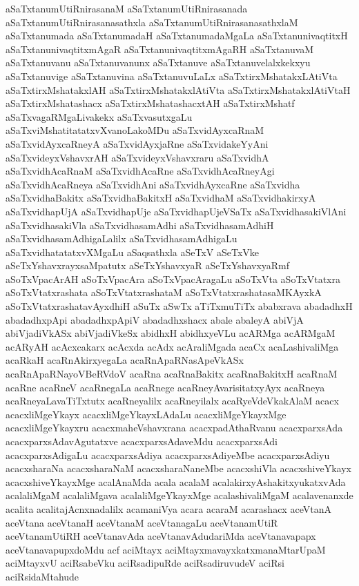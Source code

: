 {aSaTxtanumUtiRnirasanaM
aSaTxtanumUtiRnirasanada
aSaTxtanumUtiRnirasanasathxla
aSaTxtanumUtiRnirasanasathxlaM
aSaTxtanumada
aSaTxtanumadaH
aSaTxtanumadaMgaLa
aSaTxtanunivaqtitxH
aSaTxtanunivaqtitxmAgaR
aSaTxtanunivaqtitxmAgaRH
aSaTxtanuvaM
aSaTxtanuvanu
aSaTxtanuvanunx
aSaTxtanuve
aSaTxtanuvelalxkekxyu
aSaTxtanuvige
aSaTxtanuvina
aSaTxtanuvuLaLx
aSaTxtirxMshatakxLAtiVta
aSaTxtirxMshatakxlAH
aSaTxtirxMshatakxlAtiVta
aSaTxtirxMshatakxlAtiVtaH
aSaTxtirxMshatashacx
aSaTxtirxMshatashacxtAH
aSaTxtirxMshatf
aSaTxvagaRMgaLivakekx
aSaTxvasutxgaLu
aSaTxviMshatitatatxvXvanoLakoMDu
aSaTxvidAyxcaRnaM
aSaTxvidAyxcaRneyA
aSaTxvidAyxjaRne
aSaTxvidakeYyAni
aSaTxvideyxVshavxrAH
aSaTxvideyxVshavxraru
aSaTxvidhA
aSaTxvidhAcaRnaM
aSaTxvidhAcaRne
aSaTxvidhAcaRneyAgi
aSaTxvidhAcaRneya
aSaTxvidhAni
aSaTxvidhAyxcaRne
aSaTxvidha
aSaTxvidhaBakitx
aSaTxvidhaBakitxH
aSaTxvidhaM
aSaTxvidhakirxyA
aSaTxvidhapUjA
aSaTxvidhapUje
aSaTxvidhapUjeVSaTx
aSaTxvidhasakiVlAni
aSaTxvidhasakiVla
aSaTxvidhasamAdhi
aSaTxvidhasamAdhiH
aSaTxvidhasamAdhigaLalilx
aSaTxvidhasamAdhigaLu
aSaTxvidhatatatxvXMgaLu
aSaqsathxla
aSeTxV
aSeTxVke
aSeTxYshavxrayxsaMpatutx
aSeTxYshavxyaR
aSeTxYshavxyaRmf
aSoTxVpacArAH
aSoTxVpacAra
aSoTxVpacAragaLu
aSoTxVta
aSoTxVtatxra
aSoTxVtatxrashata
aSoTxVtatxrashataM
aSoTxVtatxrashatasaMKAyxkA
aSoTxVtatxrashatavAyxdhiH
aSuTx
aSwTx
aTiTxmuTiTx
ababxrava
abadadhxH
abadadhxpApi
abadadhxpApiV
abadadhxshacx
abale
abaleyA
abiVjA
abiVjadiVkASx
abiVjadiVkeSx
abidhxH
abidhxyeVLu
acARMga
acARMgaM
acARyAH
acAcxcakarx
acAcxda
acAdx
acAraliMgada
acaCx
acaLashivaliMga
acaRkaH
acaRnAkirxyegaLa
acaRnApaRNasApeVkASx
acaRnApaRNayoVBeRVdoV
acaRna
acaRnaBakitx
acaRnaBakitxH
acaRnaM
acaRne
acaRneV
acaRnegaLa
acaRnege
acaRneyAvarisitatxyAyx
acaRneya
acaRneyaLavaTiTxtutx
acaRneyalilx
acaRneyilalx
acaRyeVdeVkakAlaM
acacx
acacxliMgeYkayx
acacxliMgeYkayxLAdaLu
acacxliMgeYkayxMge
acacxliMgeYkayxru
acacxmaheVshavxrana
acacxpadAthaRvanu
acacxparxsAda
acacxparxsAdavAgutatxve
acacxparxsAdaveMdu
acacxparxsAdi
acacxparxsAdigaLu
acacxparxsAdiya
acacxparxsAdiyeMbe
acacxparxsAdiyu
acacxsharaNa
acacxsharaNaM
acacxsharaNaneMbe
acacxshiVla
acacxshiveYkayx
acacxshiveYkayxMge
acalAnaMda
acala
acalaM
acalakirxyAshakitxyukatxvAda
acalaliMgaM
acalaliMgava
acalaliMgeYkayxMge
acalashivaliMgaM
acalavenanxde
acalita
acalitajAcnxnadalilx
acamaniVya
acara
acaraM
acarashacx
aceVtanA
aceVtana
aceVtanaH
aceVtanaM
aceVtanagaLu
aceVtanamUtiR
aceVtanamUtiRH
aceVtanavAda
aceVtanavAdudariMda
aceVtanavapapx
aceVtanavapupxdoMdu
acf
aciMtayx
aciMtayxmavayxkatxmanaMtarUpaM
aciMtayxvU
aciRsabeVku
aciRsadipuRde
aciRsadiruvudeV
aciRsi
aciRsidaMtahude
}
